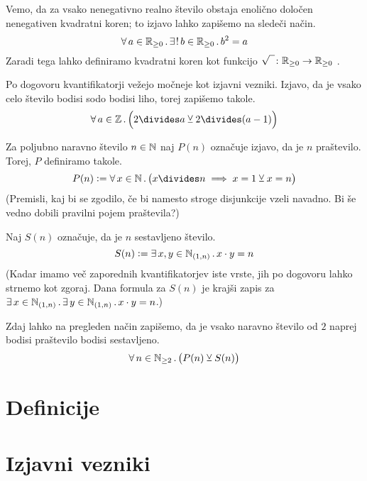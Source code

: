 \begin{zgled}
Vemo, da za vsako nenegativno realno število obstaja enolično določen nenegativen kvadratni koren; to izjavo lahko zapišemo na sledeči način.
\[\xall{a}[\RR_{\geq 0}]{\xexactlyone{b}[\RR_{\geq 0}]{b^2 = a}}\]
Zaradi tega lahko definiramo kvadratni koren kot funkcijo $\sqrt{\phantom{I}}\colon \mathbb{R}_{\geq 0} \to \mathbb{R}_{\geq 0}$ .
\end{zgled}

Po dogovoru kvantifikatorji vežejo močneje kot izjavni vezniki. Izjavo, da je vsako celo število bodisi sodo bodisi liho, torej zapišemo takole.
\[\all[2]{a}[\ZZ]{2 \divides a \xor 2 \divides (a-1)}\]

\begin{zgled}
Za poljubno naravno število $n \in \mathbb{N}$ naj $P(n)$ označuje izjavo, da je $n$ praštevilo. Torej, $P$ definiramo takole.
\[P(n) \dfeq \all[1]{x}[\NN]{x \divides n \implies x = 1 \xor x = n}\]
(Premisli, kaj bi se zgodilo, če bi namesto stroge disjunkcije vzeli navadno. Bi še vedno dobili pravilni pojem praštevila?)

Naj $S(n)$ označuje, da je $n$ sestavljeno število.
\[S(n) \dfeq \xsome{x, y}[\intoo[\NN]{1}{n}]{x \cdot y = n}\]
(Kadar imamo več zaporednih kvantifikatorjev iste vrste, jih po dogovoru lahko strnemo kot zgoraj. Dana formula za $S(n)$ je krajši zapis za $\xsome{x}[\intoo[\NN]{1}{n}]{\xsome{y}[\intoo[\NN]{1}{n}]{x \cdot y = n}}$.)

Zdaj lahko na pregleden način zapišemo, da je vsako naravno število od $2$ naprej bodisi praštevilo bodisi sestavljeno.
\[\all[1]{n}[\NN_{\geq 2}]{P(n) \xor S(n)}\]
\end{zgled}

\section{Definicije}








        \section{Izjavni vezniki}

